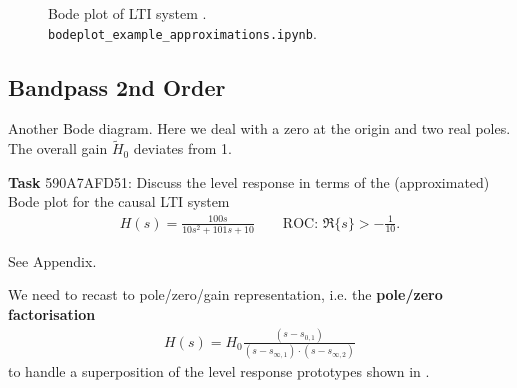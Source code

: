\begin{figure}[h!]
\centering
{}

\caption{Bode plot of LTI system .
\texttt{bodeplot\_example\_approximations.ipynb}.}
\label{fig:bodeplot_example_approximations_44EB4169E9}
\end{figure}





\clearpage
\subsection{Bandpass 2nd Order}
\label{sec:590A7AFD51}
\begin{Ziel}
Another Bode diagram. Here we deal with a zero at the origin and two real
poles. The overall gain $\tilde{H}_0$ deviates from 1.
\end{Ziel}
\textbf{Task} {\tiny 590A7AFD51}: Discuss the level response in terms
of the (approximated) Bode plot for the causal LTI system
\begin{align}
H(s) = \frac{100 s}{10 s^2 + 101 s + 10}\qquad\text{ROC: }
\Re\{s\}>-\frac{1}{10}.
\end{align}
\begin{Werkzeug}
See Appendix.
\end{Werkzeug}
\begin{Ansatz}
We need to recast to pole/zero/gain representation, i.e. the \textbf{pole/zero factorisation}
\begin{align}
H(s) = H_0\frac{(s-s_{0,1})}{(s-s_{\infty,1})\cdot(s-s_{\infty,2})}
\end{align}
to handle a superposition of the level response prototypes shown in
.
\end{Ansatz}

